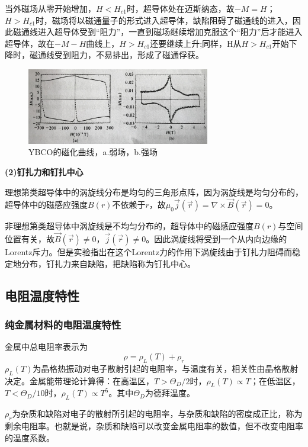 \documentclass[UTF8]{ctexart}
\begin{document}
\begin{multicols}{2}
当外磁场从零开始增加，$H<H_{c1}$时，超导体处在迈斯纳态，故$-M=H$；$H>H_{c1}$时，磁场将以磁通量子的形式进入超导体，缺陷阻碍了磁通线的进入，因此磁通线进入超导体受到“阻力”，一直到磁场继续增加克服这个“阻力”后才能进入超导体，故在$-M-H$曲线上，$H>H_{c1}$还要继续上升;同样，H从$H>H_{c1}$开始下降时，磁通线受到阻力，不易排出，形成了磁通俘获。
\begin{figure}[H]
\centering
\includegraphics[width=8cm]{8.jpg}
\caption{\small{YBCO的磁化曲线，a.弱场，b.强场}}
\end{figure}

\noindent\textbf{(2)钉扎力和钉扎中心}

理想第\uppercase\expandafter{}类超导体中的涡旋线分布是均匀的三角形点阵，因为涡旋线是均匀分布的，超导体中的磁感应强度$B(r)$不依赖于$r$，故$\mu_{0}\vec{j}(\vec{r})=\nabla \times \vec{B}(\vec{r})=0$。

非理想第\uppercase\expandafter{}类超导体中涡旋线是不均匀分布的，超导体中的磁感应强度$B(r)$与空间位置有关，故$\vec{B}(\vec{r})\neq0$，$\vec{j}(\vec{r})\neq0$。因此涡旋线将受到一个从内向边缘的Lorentz斥力。但是实验指出在这个Lorentz力的作用下涡旋线由于钉扎力阻碍而稳定地分布，钉扎力来自缺陷，把缺陷称为钉扎中心。

\subsection{电阻温度特性}
\subsubsection{纯金属材料的电阻温度特性}
金属中总电阻率表示为
\begin{equation}
\rho=\rho_{L}(T)+\rho_{r}
\end{equation}
$\rho_{L}(T)$为晶格热振动对电子散射引起的电阻率，与温度有关，相关性由晶格散射决定。金属能带理论计算得：在高温区，$T>\Theta_{D} / 2$时，$\rho_{L}(T)\propto T$；在低温区，$T<\Theta_{D} /10$时，$\rho_{L}(T)\propto T^5$。其中$\Theta_{D}$为德拜温度。

$\rho_{r}$为杂质和缺陷对电子的散射所引起的电阻率，与杂质和缺陷的密度成正比，称为剩余电阻率。也就是说，杂质和缺陷可以改变金属电阻率的数值，但不改变电阻率的温度系数。


\end{multicols}
\end{document}
